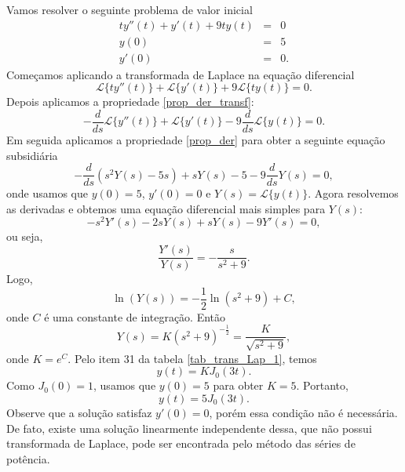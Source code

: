 \documentclass[Main.tex]{subfiles}
\begin{document}
\begin{ex}Vamos resolver o seguinte problema de valor inicial
\begin{eqnarray*}
ty''(t)+y'(t)+9ty(t)&=&0\\
y(0)&=&5\\
y'(0)&=&0.
\end{eqnarray*}
Começamos aplicando a transformada de Laplace na equação diferencial
$$
\mathcal{L}\{ty''(t)\}+\mathcal{L}\{y'(t)\}+9\mathcal{L}\{ty(t)\}=0.
$$
Depois aplicamos a propriedade \ref{prop_der_transf}:
$$
-\frac{d}{ds}\mathcal{L}\{y''(t)\}+\mathcal{L}\{y'(t)\}-9\frac{d}{ds}\mathcal{L}\{y(t)\}=0.
$$
Em seguida aplicamos a propriedade \ref{prop_der} para obter a seguinte equação subsidiária
$$
-\frac{d}{ds}\left(s^2Y(s)-5s\right)+sY(s)-5-9\frac{d}{ds}Y(s)=0,
$$
onde usamos que $y(0)=5$, $y'(0)=0$ e $Y(s)=\mathcal{L}\{y(t)\}$. Agora resolvemos as derivadas e obtemos uma equação diferencial mais simples para $Y(s)$:
$$
-s^2Y'(s)-2sY(s)+sY(s)-9Y'(s)=0,
$$
ou seja,
$$
\frac{Y'(s)}{Y(s)}=-\frac{s}{s^2+9}.
$$
Logo,
$$
\ln(Y(s))=-\frac{1}{2}\ln(s^2+9)+C,
$$
onde $C$ é uma constante de integração. Então
$$
Y(s)=K(s^2+9)^{-\frac{1}{2}}=\frac{K}{\sqrt{s^2+9}},
$$
onde $K=e^{C}$. Pelo item 31 da tabela \ref{tab_trans_Lap_1}, temos
$$
y(t)=KJ_0(3t).
$$
Como $J_0(0)=1$, usamos que $y(0)=5$ para obter $K=5$. Portanto,
$$
y(t)=5J_0(3t).
$$
Observe que a solução satisfaz $y'(0)=0$, porém essa condição não é necessária. De fato, existe uma solução linearmente independente dessa, que não possui transformada de Laplace, pode ser encontrada pelo método das séries de potência.
\end{ex}
\end{document}
